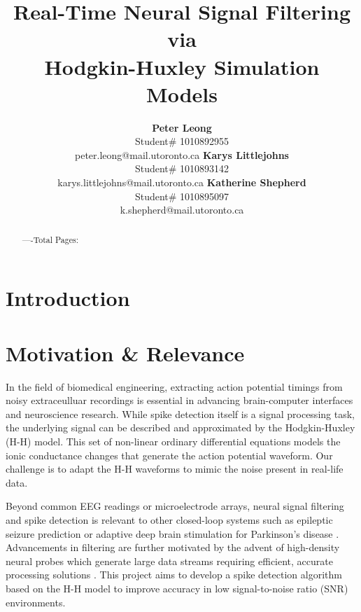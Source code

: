 \documentclass{article} %
\title{Real-Time Neural Signal Filtering via \\
Hodgkin-Huxley Simulation Models}
\author{\textbf{Peter Leong} \\
    Student\# 1010892955 \\
    peter.leong@mail.utoronto.ca
\And
    \textbf{Karys Littlejohns} \\
    Student\# 1010893142 \\
    karys.littlejohns@mail.utoronto.ca
\And
    \textbf{Katherine Shepherd} \\
    Student\# 1010895097 \\
    k.shepherd@mail.utoronto.ca
}
\begin{document}
\maketitle



\begin{abstract}

----Total Pages: \pageref{last_page}
\end{abstract}

\vspace{2ex}

\begin{multicols}{2}

\section{Introduction}
\label{sec: introduction}

\section{Motivation \& Relevance}
\label{sec: motivation_relevance}

In the field of biomedical engineering, extracting action potential timings from noisy extraceulluar recordings is essential in advancing brain-computer interfaces and neuroscience research.
While spike detection itself is a signal processing task, the underlying signal can be described and approximated by the Hodgkin-Huxley (H-H) model.
This set of non-linear ordinary differential equations models the ionic conductance changes that generate the action potential waveform.
Our challenge is to adapt the H-H waveforms to mimic the noise present in real-life data.

Beyond common EEG readings or microelectrode arrays, neural signal filtering and spike detection is relevant to other closed-loop systems such as epileptic seizure prediction \citep{addai-domfe2024epileptic} or adaptive deep brain stimulation for Parkinson's disease \citep{aljalal2022parkinson}.
Advancements in filtering are further motivated by the advent of high-density neural probes which generate large data streams requiring efficient, accurate processing solutions \citep{ye2024ultra}.
This project aims to develop a spike detection algorithm based on the H-H model to improve accuracy in low signal-to-noise ratio (SNR) environments.


\end{multicols}
\end{document}
